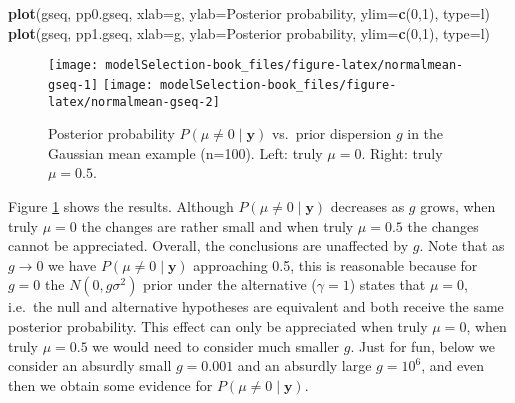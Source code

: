 \documentclass[
]{book}
\newenvironment{Shaded}{\begin{snugshade}}{\end{snugshade}}
\newcommand{\AttributeTok}[1]{\textcolor[rgb]{0.13,0.29,0.53}{#1}}
\newcommand{\DecValTok}[1]{\textcolor[rgb]{0.00,0.00,0.81}{#1}}
\newcommand{\FunctionTok}[1]{\textcolor[rgb]{0.13,0.29,0.53}{\textbf{#1}}}
\newcommand{\NormalTok}[1]{#1}
\newcommand{\StringTok}[1]{\textcolor[rgb]{0.31,0.60,0.02}{#1}}
\newcommand{\by}{\mathbf{y}}
\theoremstyle{definition}
\theoremstyle{definition}
\theoremstyle{definition}
\theoremstyle{definition}
\theoremstyle{remark}
\begin{document}
\begin{Shaded}
\begin{Highlighting}[]
\FunctionTok{plot}\NormalTok{(gseq, pp0.gseq, }\AttributeTok{xlab=}\StringTok{\textquotesingle{}g\textquotesingle{}}\NormalTok{, }\AttributeTok{ylab=}\StringTok{\textquotesingle{}Posterior probability\textquotesingle{}}\NormalTok{, }\AttributeTok{ylim=}\FunctionTok{c}\NormalTok{(}\DecValTok{0}\NormalTok{,}\DecValTok{1}\NormalTok{), }\AttributeTok{type=}\StringTok{\textquotesingle{}l\textquotesingle{}}\NormalTok{)}
\FunctionTok{plot}\NormalTok{(gseq, pp1.gseq, }\AttributeTok{xlab=}\StringTok{\textquotesingle{}g\textquotesingle{}}\NormalTok{, }\AttributeTok{ylab=}\StringTok{\textquotesingle{}Posterior probability\textquotesingle{}}\NormalTok{, }\AttributeTok{ylim=}\FunctionTok{c}\NormalTok{(}\DecValTok{0}\NormalTok{,}\DecValTok{1}\NormalTok{), }\AttributeTok{type=}\StringTok{\textquotesingle{}l\textquotesingle{}}\NormalTok{)}
\end{Highlighting}
\end{Shaded}

\begin{figure}
\texttt{[image: modelSelection-book\_files/figure-latex/normalmean-gseq-1]} \texttt{[image: modelSelection-book\_files/figure-latex/normalmean-gseq-2]} \caption{Posterior probability \(P(\mu \neq 0 \mid \by)\) vs.~prior dispersion \(g\) in the Gaussian mean example (n=100). Left: truly \(\mu=0\). Right: truly \(\mu=0.5\).}\label{fig:normalmean-gseq}
\end{figure}



Figure \ref{fig:normalmean-gseq} shows the results.
Although \(P(\mu \neq 0 \mid \by)\) decreases as \(g\) grows, when truly \(\mu=0\) the changes are rather small and when truly \(\mu=0.5\) the changes cannot be appreciated. Overall, the conclusions are unaffected by \(g\).
Note that as \(g \to 0\) we have \(P(\mu \neq 0 \mid \by)\) approaching 0.5, this is reasonable because for \(g=0\) the \(N(0, g \sigma^2)\) prior under the alternative (\(\gamma=1\)) states that \(\mu=0\), i.e.~the null and alternative hypotheses are equivalent and both receive the same posterior probability.
This effect can only be appreciated when truly \(\mu = 0\), when truly \(\mu=0.5\) we would need to consider much smaller \(g\).
Just for fun, below we consider an absurdly small \(g=0.001\) and an absurdly large \(g=10^6\), and even then we obtain some evidence for \(P(\mu \ne 0 \mid \by)\).
\end{document}
